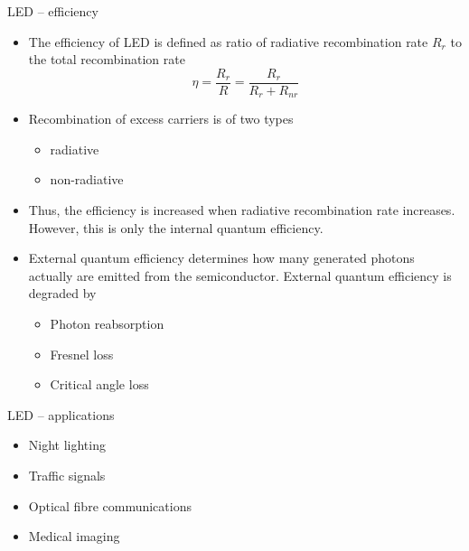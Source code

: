 \begin{frame}{LED -- efficiency}
	\begin{itemize}
		\item The efficiency of LED is defined as ratio of radiative recombination rate \(R_r\) to the total recombination rate
		\[
		\eta = \frac{R_r}{R} = \frac{R_r}{R_r + R_{nr}}
		\]
		\item Recombination of excess carriers is of two types
		\begin{itemize}
			\item radiative
			\item non-radiative
		\end{itemize}
		\item Thus, the efficiency is increased when radiative recombination rate increases. However, this is only the internal quantum efficiency.
		\item External quantum efficiency determines how many generated photons actually are emitted from the semiconductor. External quantum efficiency is degraded by
		\begin{itemize}
			\item Photon reabsorption
			\item Fresnel loss
			\item Critical angle loss
		\end{itemize}
	\end{itemize}
\end{frame}
%
\begin{frame}{LED -- applications}
	\begin{itemize}
		\item Night lighting
		\item Traffic signals
		\item Optical fibre communications
		\item Medical imaging
	\end{itemize}
\end{frame}
